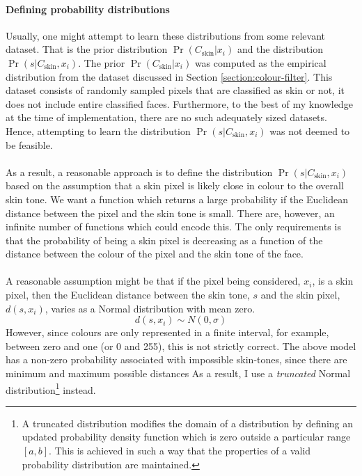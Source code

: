 \paragraph{Defining probability distributions}
Usually, one might attempt to learn these distributions from some relevant dataset. That is the prior distribution $\Pr(C_\mathrm{skin}|x_i)$ and the distribution $\Pr(s|C_\mathrm{skin}, x_i)$.
The prior $\Pr(C_\mathrm{skin}|x_i)$ was computed as the empirical distribution from 
the dataset discussed in Section \ref{section:colour-filter}. This dataset consists of randomly sampled pixels that are classified as skin or not, it does not include entire classified faces.
Furthermore, to the best of my knowledge at the time of implementation, there are no such adequately sized datasets. Hence, attempting to learn the distribution $\Pr(s|C_\mathrm{skin}, x_i)$ was not deemed to be feasible.
\\\\
As a result, a reasonable approach is to define the distribution $\Pr(s|C_\mathrm{skin}, x_i)$ based on the assumption that a skin pixel is likely close in colour to the overall skin tone. We want a function which returns a large probability if the Euclidean distance between the pixel and the skin tone is small.
There are, however, an infinite number of functions which could encode this. The only requirements is that the probability of being a skin pixel is decreasing as a function of the distance between the colour of the pixel and the skin tone of the face. 
\\\\
A reasonable assumption might be that if the pixel being considered, $x_i$, is a skin pixel, then the Euclidean distance between the skin tone, $s$ and the skin pixel, $d(s,x_i)$, varies as a Normal distribution with mean zero.
\begin{equation*}
   d(s, x_i) \sim N(0, \sigma) 
\end{equation*}
However, since colours are only represented in a finite interval, for example, between zero and one (or 0 and 255), this is not strictly correct. 
The above model has a non-zero probability associated with impossible skin-tones, since there are minimum and maximum possible distances 
As a result, I use a \textit{truncated} Normal distribution\footnote{A truncated distribution modifies the domain of a distribution by defining an updated probability density function which is zero outside a particular range $[a,b]$. This is achieved in such a way that the properties of a valid probability distribution are maintained.} instead.
